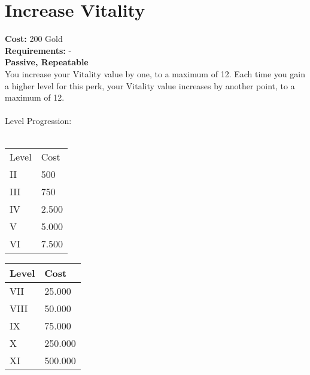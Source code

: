 \section*{Increase Vitality}\label{sec:increasevitality}
\textbf{Cost:} 200 Gold\\
\textbf{Requirements:} -\\
\textbf{Passive, Repeatable}\\
You increase your Vitality value by one, to a maximum of 12.
Each time you gain a higher level for this perk, your Vitality value increases by another point, to a maximum of 12.\\
\\
Level Progression:\\
\\
\begin{minipage}{0.5\textwidth}
    \begin{tabular}{l | l}
        Level & Cost\\
        II & 500\\
        III & 750\\
        IV & 2.500\\
        V & 5.000\\
        VI & 7.500\\
    \end{tabular}
\end{minipage}
\begin{minipage}{0.5\textwidth}
    \begin{tabular}{l | l}
        Level & Cost\\ \hline
        VII & 25.000\\
        VIII & 50.000\\
        IX & 75.000\\
        X & 250.000\\
        XI & 500.000\\
    \end{tabular}
\end{minipage}